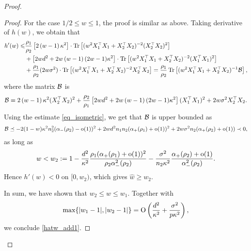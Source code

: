 \begin{proof}
\begin{proof}
For the case $1/2\le w\le 1$, the proof is similar as above. Taking derivative of $h(w)$, we obtain that
\begin{align}
	h'(w) \le& \frac{\rho_1}{\rho_2} \left[2\left( w-1\right) \kappa^2\right]\cdot \tr\left[( w^2X_1^{\top}X_1 +X_2^{\top}X_2)^{-2} (X_2^{\top}X_2)^2\right] \nonumber \\
	& +  \left[2wd^2 +2w\left( w-1\right)(2w-1)\kappa^2\right]\cdot \tr\left[( w^2X_1^{\top}X_1 +X_2^{\top}X_2)^{-2} (X_1^{\top}X_1)^2\right] \nonumber\\
	& + \frac{\rho_1}{\rho_2}(2 w\sigma^2) \cdot \bigtr{(w^2X_1^{\top}X_1 + X_2^{\top}X_2)^{-2} X_2^\top X_2  }= \frac{\rho_1}{\rho_2} \bigtr{(w^2X_1^{\top}X_1  + X_2^{\top}X_2)^{-1} \cal B} , \nonumber
\end{align}
where the matrix $\cal B$ is
$$\cal B= 2\left( w-1\right) \kappa^2  (X_2^{\top}X_2)^2+\frac{\rho_2}{\rho_1}\left[2wd^2 +2w\left( w-1\right)(2w-1)\kappa^2\right](X_1^{\top}X_1)^2 + 2 w\sigma^2 X_2^\top X_2 .$$
Using the estimate \eqref{eq_isometric}, we get that $\cal B$ is upper bounded as
\begin{align*}
\cal B \preceq - 2(1-w)\kappa^2 n_2^2 (\al_-(\rho_2) -\oo(1))^2 +2w d^2 n_1n_2 (\al_+(\rho_1) +\oo(1))^2 + 2w\sigma^2 n_2 (\al_+(\rho_2)+\oo(1)) \prec 0,
\end{align*}
as long as
$$w< w_2:=1 -   \frac{d^2}{\kappa^2}\frac{\rho_1(\al_+(\rho_1) +\oo(1))^2}{\rho_2 \al_-^2(\rho_2) } -  \frac{\sigma^2}{n_2\kappa^2}\frac{\al_{+}(\rho_2)+\oo(1)}{\al_{-}^2(\rho_2)} .$$
Hence $h'(w)<0$ on $[0,w_2)$, %
which gives $\hat w\ge w_2$.

In sum, we have shown that $w_2\le w\le w_1$. Together with
$$\max\{|w_1 -1|, |w_2 -1|\} =\OO\left(\frac{d^2}{\kappa^2} + \frac{\sigma^2}{p\kappa^2}\right),$$
we conclude \eqref{hatw_add1}.
\end{proof}


\end{proof}
